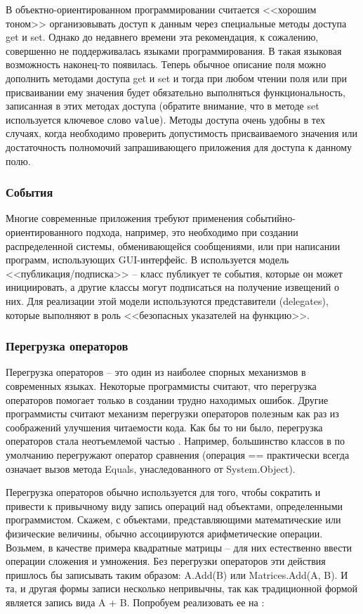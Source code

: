 В объектно-ориентированном программировании считается <<хорошим тоном>> организовывать доступ к данным через специальные методы доступа get и set. Однако до недавнего времени эта рекомендация, к сожалению, совершенно не поддерживалась языками программирования. В \CSharp такая языковая возможность наконец-то появилась. Теперь обычное описание поля можно дополнить методами доступа get и set и тогда при любом чтении поля или при присваивании ему значения будет обязательно выполняться функциональность, записанная в этих методах доступа (обратите внимание, что в методе set используется ключевое слово \lstinline{value}). Методы доступа очень удобны в тех случаях, когда необходимо проверить допустимость присваиваемого значения или достаточность полномочий запрашивающего приложения для доступа к данному полю.


\subsubsection{События}

Многие современные приложения требуют применения событийно-ориентированного подхода, например, это необходимо при создании распределенной системы, обменивающейся сообщениями, или при написании программ, использующих GUI-интерфейс. В \CSharp используется модель <<публикация/подписка>> -- класс публикует те события, которые он может инициировать, а другие классы могут подписаться на получение извещений о них. Для реализации этой модели используются представители (delegates), которые выполняют в \CSharp роль <<безопасных указателей на функцию>>.


\subsubsection{Перегрузка операторов}

Перегрузка операторов -- это один из наиболее спорных механизмов в современных языках. Некоторые программисты считают, что перегрузка операторов помогает только в создании трудно находимых ошибок. Другие программисты считают механизм перегрузки операторов полезным как раз из соображений улучшения читаемости кода. Как бы то ни было, перегрузка операторов стала неотъемлемой частью \CSharp. Например, большинство классов в \CSharp по умолчанию перегружают оператор сравнения (операция == практически всегда означает вызов метода Equals, унаследованного от System.Object).

Перегрузка операторов обычно используется для того, чтобы сократить и привести к привычному виду запись операций над объектами, определенными программистом. Скажем, с объектами, представляющими математические или физические величины, обычно ассоциируются арифметические операции. Возьмем, в качестве примера квадратные матрицы -- для них естественно ввести операции сложения и умножения. Без перегрузки операторов эти действия пришлось бы записывать таким образом: A.Add(B) или Matrices.Add(A, B). И та, и другая формы записи несколько непривычны, так как традиционной формой является запись вида A + B. Попробуем реализовать ее на \CSharp:

